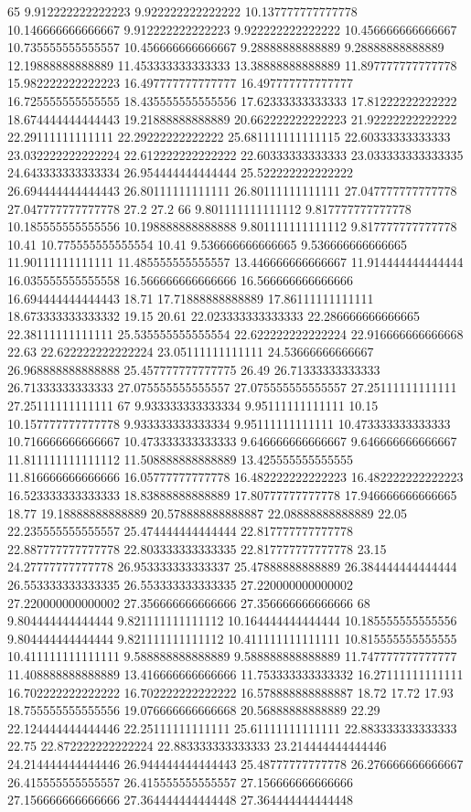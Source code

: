 65 9.912222222222223 9.922222222222222 10.137777777777778 10.146666666666667 9.912222222222223 9.922222222222222 10.456666666666667 10.735555555555557 10.456666666666667 9.28888888888889 9.28888888888889 12.19888888888889 11.453333333333333 13.38888888888889 11.897777777777778 15.982222222222223 16.497777777777777 16.497777777777777 16.725555555555555 18.435555555555556 17.62333333333333 17.81222222222222 18.674444444444443 19.21888888888889 20.662222222222223 21.92222222222222 22.29111111111111 22.29222222222222 25.681111111111115 22.60333333333333 23.032222222222224 22.612222222222222 22.60333333333333 23.033333333333335 24.643333333333334 26.954444444444444 25.522222222222222 26.694444444444443 26.80111111111111 26.80111111111111 27.047777777777778 27.047777777777778 27.2 27.2
66 9.801111111111112 9.817777777777778 10.185555555555556 10.198888888888888 9.801111111111112 9.817777777777778 10.41 10.775555555555554 10.41 9.536666666666665 9.536666666666665 11.90111111111111 11.485555555555557 13.446666666666667 11.914444444444444 16.035555555555558 16.566666666666666 16.566666666666666 16.694444444444443 18.71 17.71888888888889 17.86111111111111 18.673333333333332 19.15 20.61 22.023333333333333 22.286666666666665 22.38111111111111 25.535555555555554 22.622222222222224 22.916666666666668 22.63 22.622222222222224 23.05111111111111 24.53666666666667 26.968888888888888 25.457777777777775 26.49 26.71333333333333 26.71333333333333 27.075555555555557 27.075555555555557 27.25111111111111 27.25111111111111
67 9.933333333333334 9.95111111111111 10.15 10.157777777777778 9.933333333333334 9.95111111111111 10.473333333333333 10.716666666666667 10.473333333333333 9.646666666666667 9.646666666666667 11.811111111111112 11.508888888888889 13.425555555555555 11.816666666666666 16.05777777777778 16.482222222222223 16.482222222222223 16.523333333333333 18.83888888888889 17.80777777777778 17.946666666666665 18.77 19.18888888888889 20.578888888888887 22.08888888888889 22.05 22.235555555555557 25.474444444444444 22.817777777777778 22.887777777777778 22.803333333333335 22.817777777777778 23.15 24.27777777777778 26.953333333333337 25.47888888888889 26.384444444444444 26.553333333333335 26.553333333333335 27.220000000000002 27.220000000000002 27.356666666666666 27.356666666666666
68 9.804444444444444 9.821111111111112 10.164444444444444 10.185555555555556 9.804444444444444 9.821111111111112 10.411111111111111 10.815555555555555 10.411111111111111 9.588888888888889 9.588888888888889 11.747777777777777 11.408888888888889 13.416666666666666 11.753333333333332 16.27111111111111 16.702222222222222 16.702222222222222 16.578888888888887 18.72 17.72 17.93 18.755555555555556 19.076666666666668 20.56888888888889 22.29 22.124444444444446 22.25111111111111 25.61111111111111 22.883333333333333 22.75 22.872222222222224 22.883333333333333 23.214444444444446 24.214444444444446 26.944444444444443 25.48777777777778 26.276666666666667 26.415555555555557 26.415555555555557 27.156666666666666 27.156666666666666 27.364444444444448 27.364444444444448
